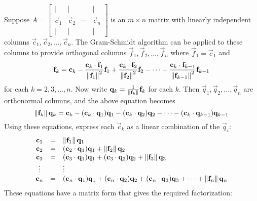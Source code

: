 \documentclass{ximera}
\begin{document}
Suppose $A = \left[ \begin{array}{cccc}
|&|& &| \\
\vec{c}_{1} & \vec{c}_{2} & \cdots &  \vec{c}_{n}\\
|&|& &|
\end{array}\right]$ is an $m \times n$ matrix with linearly independent columns $\vec{c}_{1}, \vec{c}_{2}, \dots, \vec{c}_{n}$. The Gram-Schmidt algorithm can be applied to these columns to provide orthogonal columns $\vec{f}_{1}, \vec{f}_{2}, \dots, \vec{f}_{n}$ where $\vec{f}_{1} = \vec{c}_{1}$ and
\begin{equation*}
\mathbf{f}_{k} = \mathbf{c}_{k} - \frac{\mathbf{c}_{k} \cdot \mathbf{f}_{1}}{\left\lVert \mathbf{f}_{1} \right\rVert^2}\mathbf{f}_{1} + \frac{\mathbf{c}_{k} \cdot \mathbf{f}_{2}}{\left\lVert \mathbf{f}_{2} \right\rVert^2}\mathbf{f}_{2} - \dots - \frac{\mathbf{c}_{k} \cdot \mathbf{f}_{k-1}}{\left\lVert \mathbf{f}_{k-1} \right\rVert^2}\mathbf{f}_{k-1}
\end{equation*}
for each $k = 2, 3, \dots, n$. Now write $\mathbf{q}_{k} = \frac{1}{\left\lVert \mathbf{f}_{k} \right\rVert}\mathbf{f}_{k}$ for each $k$. Then $\vec{q}_{1}, \vec{q}_{2}, \dots, \vec{q}_{n}$ are orthonormal columns, and the above equation becomes
\begin{equation*}
\left\lVert \mathbf{f}_{k} \right\rVert \mathbf{q}_{k} = \mathbf{c}_{k} - (\mathbf{c}_{k} \cdot \mathbf{q}_{1})\mathbf{q}_{1} - (\mathbf{c}_{k} \cdot \mathbf{q}_{2})\mathbf{q}_{2} - \dots - (\mathbf{c}_{k} \cdot \mathbf{q}_{k-1})\mathbf{q}_{k-1}
\end{equation*}
Using these equations, express each $\vec{c}_{k}$ as a linear combination of the $\vec{q}_{i}$:
\begin{equation*}
\begin{array}{ccl}
\mathbf{c}_{1} &=& \left\lVert \mathbf{f}_{1} \right\rVert \mathbf{q}_{1} \\
\mathbf{c}_{2} &=& (\mathbf{c}_{2} \cdot \mathbf{q}_{1})\mathbf{q}_{1} + \left\lVert \mathbf{f}_{2} \right\rVert \mathbf{q}_{2} \\
\mathbf{c}_{3} &=& (\mathbf{c}_{3} \cdot \mathbf{q}_{1})\mathbf{q}_{1} + (\mathbf{c}_{3} \cdot \mathbf{q}_{2})\mathbf{q}_{2} + \left\lVert \mathbf{f}_{3} \right\rVert \mathbf{q}_{3} \\
\vdots && \vdots \\
\mathbf{c}_{n} &=& (\mathbf{c}_{n} \cdot \mathbf{q}_{1})\mathbf{q}_{1} + (\mathbf{c}_{n} \cdot \mathbf{q}_{2})\mathbf{q}_{2} + (\mathbf{c}_{n} \cdot \mathbf{q}_{3})\mathbf{q}_{3} + \dots + \left\lVert \mathbf{f}_{n} \right\rVert \mathbf{q}_{n}
\end{array}
\end{equation*}
These equations have a matrix form that gives the required factorization:
\end{document}
